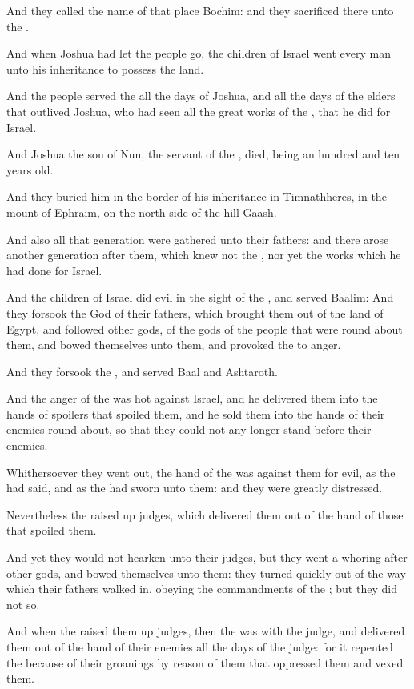 \verse And they called the name of that place Bochim: and they sacrificed there unto the \LORD.

\verse And when Joshua had let the people go, the children of Israel went every man unto his inheritance to possess the land.

\verse And the people served the \LORD all the days of Joshua, and all the days of the elders that outlived Joshua, who had seen all the great works of the \LORD, that he did for Israel.

\verse And Joshua the son of Nun, the servant of the \LORD, died, being an hundred and ten years old.

\verse And they buried him in the border of his inheritance in Timnathheres, in the mount of Ephraim, on the north side of the hill Gaash.

\verse And also all that generation were gathered unto their fathers: and there arose another generation after them, which knew not the \LORD, nor yet the works which he had done for Israel.

\verse And the children of Israel did evil in the sight of the \LORD, and served Baalim: \verse And they forsook the \LORD God of their fathers, which brought them out of the land of Egypt, and followed other gods, of the gods of the people that were round about them, and bowed themselves unto them, and provoked the \LORD to anger.

\verse And they forsook the \LORD, and served Baal and Ashtaroth.

\verse And the anger of the \LORD was hot against Israel, and he delivered them into the hands of spoilers that spoiled them, and he sold them into the hands of their enemies round about, so that they could not any longer stand before their enemies.

\verse Whithersoever they went out, the hand of the \LORD was against them for evil, as the \LORD had said, and as the \LORD had sworn unto them: and they were greatly distressed.

\verse Nevertheless the \LORD raised up judges, which delivered them out of the hand of those that spoiled them.

\verse And yet they would not hearken unto their judges, but they went a whoring after other gods, and bowed themselves unto them: they turned quickly out of the way which their fathers walked in, obeying the commandments of the \LORD; but they did not so.

\verse And when the \LORD raised them up judges, then the \LORD was with the judge, and delivered them out of the hand of their enemies all the days of the judge: for it repented the \LORD because of their groanings by reason of them that oppressed them and vexed them.

